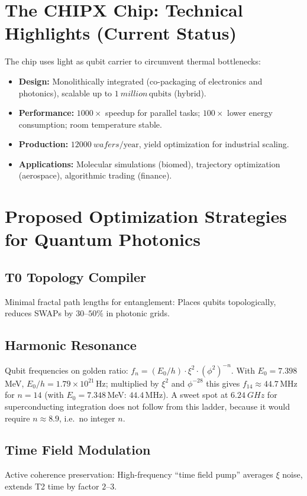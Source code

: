 	\section{The CHIPX Chip: Technical Highlights (Current Status)}
	
	The chip uses light as qubit carrier to circumvent thermal bottlenecks:
	\begin{itemize}
		\item \textbf{Design:} Monolithically integrated (co-packaging of electronics and photonics), scalable up to $\SI{1}{million}\, \text{qubits}$ (hybrid).
		\item \textbf{Performance:} $1000\times$ speedup for parallel tasks; $100\times$ lower energy consumption; room temperature stable.
		\item \textbf{Production:} $\SI{12000}{wafers}/\text{year}$, yield optimization for industrial scaling.
		\item \textbf{Applications:} Molecular simulations (biomed), trajectory optimization (aerospace), algorithmic trading (finance).
	\end{itemize}
	
	\section{Proposed Optimization Strategies for Quantum Photonics}
	
	\subsection{T0 Topology Compiler}
	Minimal fractal path lengths for entanglement: Places qubits topologically, reduces SWAPs by $30$--$50\%$ in photonic grids.
	
	\subsection{Harmonic Resonance}
	Qubit frequencies on golden ratio: $f_n = (E_0 / h) \cdot \xi^2 \cdot (\phi^2)^{-n}$. With $E_0 = 7.398$\,MeV, $E_0/h = 1.79 \times 10^{21}$\,Hz; multiplied by $\xi^2$ and $\phi^{-28}$ this gives $f_{14} \approx 44.7$\,MHz for $n=14$ (with $E_0 = 7.348$\,MeV: $44.4$\,MHz). A sweet spot at $\SI{6.24}{GHz}$ for superconducting integration does not follow from this ladder, because it would require $n \approx 8.9$, i.e.\ no integer $n$.
	
	\subsection{Time Field Modulation}
	Active coherence preservation: High-frequency ``time field pump'' averages $\xi$ noise, extends T2 time by factor $2$--$3$.
	
